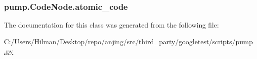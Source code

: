 \subsubsection[{atomic\+\_\+code}]{\setlength{\rightskip}{0pt plus 5cm}pump.\+Code\+Node.\+atomic\+\_\+code}\label{classpump_1_1_code_node_ac7251110cc987c709e0e17d95521993e}


The documentation for this class was generated from the following file\+:\begin{DoxyCompactItemize}
\item 
C\+:/\+Users/\+Hilman/\+Desktop/repo/anjing/src/third\+\_\+party/googletest/scripts/\hyperlink{pump_8py}{pump.\+py}\end{DoxyCompactItemize}
